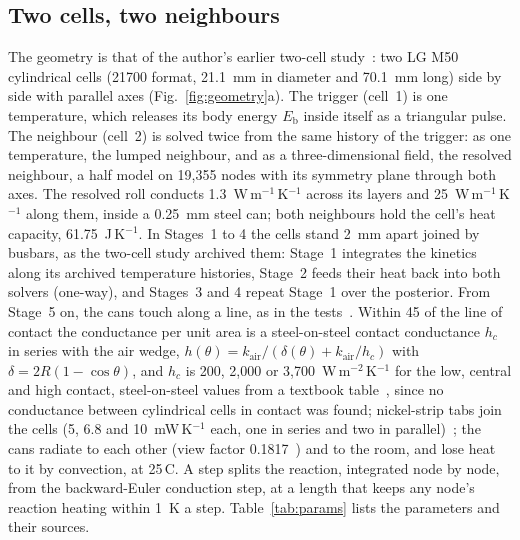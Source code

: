 \documentclass[preprint,12pt]{elsarticle}
\newcommand{\degC}{\,\textdegree C}
\newcommand{\Eb}{E_{\mathrm{b}}}
\begin{document}
\subsection{Two cells, two neighbours}
\label{sec:geometry}

The geometry is that of the author's earlier two-cell study~\cite{satte2026twocell}: two LG M50 cylindrical cells (21700 format, 21.1~mm in diameter and 70.1~mm long) side by side with parallel axes (Fig.~\ref{fig:geometry}a). The trigger (cell~1) is one temperature, which releases its body energy $\Eb$ inside itself as a triangular pulse. The neighbour (cell~2) is solved twice from the same history of the trigger: as one temperature, the lumped neighbour, and as a three-dimensional field, the resolved neighbour, a half model on 19,355 nodes with its symmetry plane through both axes. The resolved roll conducts 1.3~W\,m$^{-1}$\,K$^{-1}$ across its layers and 25~W\,m$^{-1}$\,K$^{-1}$ along them, inside a 0.25~mm steel can; both neighbours hold the cell's heat capacity, 61.75~J\,K$^{-1}$. In Stages~1 to 4 the cells stand 2~mm apart joined by busbars, as the two-cell study archived them: Stage~1 integrates the kinetics along its archived temperature histories, Stage~2 feeds their heat back into both solvers (one-way), and Stages~3 and 4 repeat Stage~1 over the posterior. From Stage~5 on, the cans touch along a line, as in the tests~\cite{fransson2024exploring}. Within 45\textdegree{} of the line of contact the conductance per unit area is a steel-on-steel contact conductance $h_c$ in series with the air wedge, $h(\theta)=k_{\mathrm{air}}/(\delta(\theta)+k_{\mathrm{air}}/h_c)$ with $\delta=2R(1-\cos\theta)$, and $h_c$ is 200, 2,000 or 3,700~W\,m$^{-2}$\,K$^{-1}$ for the low, central and high contact, steel-on-steel values from a textbook table~\cite[Table~2.1]{lienhard2024heat}, since no conductance between cylindrical cells in contact was found; nickel-strip tabs join the cells (5, 6.8 and 10~mW\,K$^{-1}$ each, one in series and two in parallel)~\cite{satte2026twocell}; the cans radiate to each other (view factor 0.1817~\cite{bergman2011fundamentals}) and to the room, and lose heat to it by convection, at 25\degC. A step splits the reaction, integrated node by node, from the backward-Euler conduction step, at a length that keeps any node's reaction heating within 1~K a step. Table~\ref{tab:params} lists the parameters and their sources.
\end{document}
